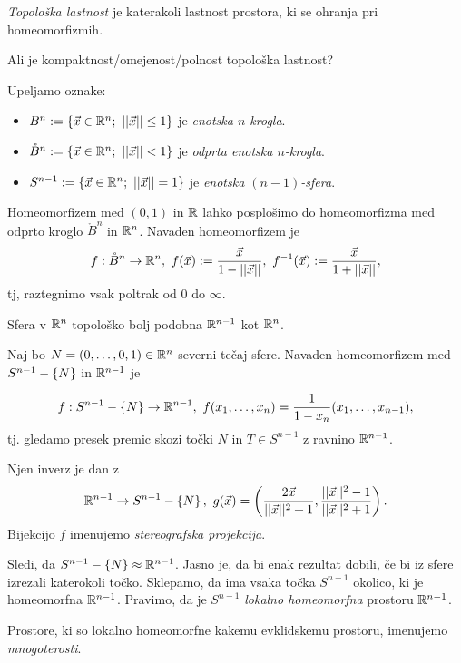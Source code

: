 \begin{definicija}
    \emph{Topološka lastnost} je katerakoli lastnost prostora, ki se ohranja pri homeomorfizmih.
\end{definicija}

\begin{primer}
    Ali je kompaktnost/omejenost/polnost topološka lastnost?
\end{primer}

Upeljamo oznake:
\begin{itemize}
    \item $B^n := \set{\vec{x} \in \RR^n; \ ||\vec{x}|| \leq 1}$ je \emph{enotska $n$-krogla}.
    \item $\mathring{B}^n := \left\{\vec{x} \in \mathbb{R}^n; \ ||\vec{x}|| < 1\right\}$ je \emph{odprta enotska $n$-krogla}.
    \item $S^{n-1} := \set{\vec{x} \in \RR^n; \ ||\vec{x}|| = 1}$ je \emph{enotska $(n-1)$-sfera}.
\end{itemize}

Homeomorfizem med $(0, 1)$ in $\mathbb{R}$ lahko posplošimo do homeomorfizma med odprto kroglo $\mathring{B}^n$ in $\mathbb{R}^n$. Navaden homeomorfizem je
$$f: \mathring{B}^n \to \mathbb{R}^n, \ f(\vec{x}) := \frac{\vec{x}}{1 - ||\vec{x}||}, \ f^{-1}(\vec{x}) := \frac{\vec{x}}{1 + ||\vec{x}||},$$
tj, raztegnimo vsak poltrak od $0$ do $\infty$.

Sfera v $\mathbb{R}^n$ topološko bolj podobna $\mathbb{R}^{n-1}$ kot $\mathbb{R}^n$.

Naj bo $N = (0, \ldots, 0, 1) \in \mathbb{R}^n$ severni tečaj sfere. Navaden homeomorfizem med $S^{n-1} - \left\{N\right\}$ in $\mathbb{R}^{n-1}$ je 

$$f: S^{n-1} - \set{N} \to \RR^{n-1}, \ f(x_1, \ldots, x_n) = \frac{1}{1 - x_n}(x_1, \ldots, x_{n-1}),$$
tj. gledamo presek premic skozi točki $N$ in $T \in S^{n-1}$ z ravnino $\mathbb{R}^{n-1}$.

Njen inverz je dan z
$$\mathbb{R}^{n-1} \to S^{n-1} - \left\{N\right\},\  g(\vec{x}) = \left(\frac{2\vec{x}}{||\vec{x}||^2 + 1}, \frac{||\vec{x}||^2-1}{||\vec{x}||^2+1}\right).$$
Bijekcijo $f$ imenujemo \emph{stereografska projekcija}.

Sledi, da $S^{n-1} - \left\{N\right\} \approx \mathbb{R}^{n-1}$. Jasno je, da bi enak rezultat dobili, če bi iz sfere izrezali katerokoli točko. Sklepamo, da ima vsaka točka $S^{n-1}$ okolico, ki je homeomorfna $\mathbb{R}^{n-1}$. Pravimo, da je $S^{n-1}$ \emph{lokalno homeomorfna} prostoru $\mathbb{R}^{n-1}$.

\begin{definicija}
    Prostore, ki so lokalno homeomorfne kakemu evklidskemu prostoru, imenujemo \emph{mnogoterosti}.
\end{definicija}

